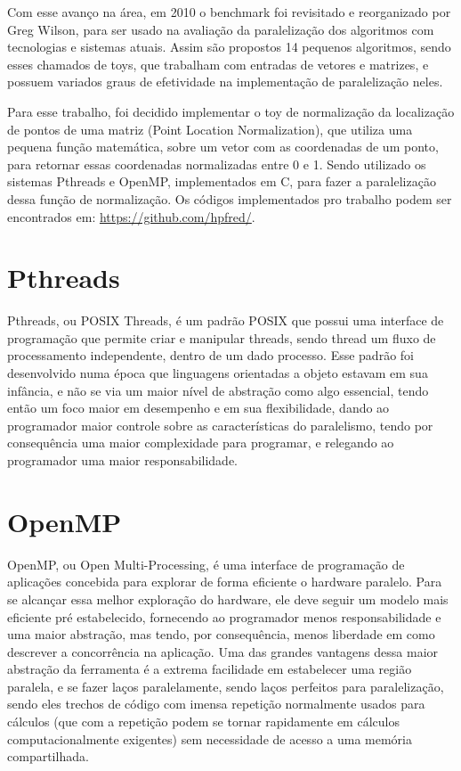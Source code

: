 \documentclass[12pt]{article}
\begin{document}
Com esse avanço na área, em 2010 o benchmark foi revisitado e reorganizado por Greg Wilson, para ser usado na avaliação da paralelização dos algoritmos com tecnologias e sistemas atuais. Assim são propostos 14 pequenos algoritmos, sendo esses chamados de toys, que trabalham com entradas de vetores e matrizes, e possuem variados graus de efetividade na implementação de paralelização neles.

Para esse trabalho, foi decidido implementar o toy de normalização da localização de pontos de uma matriz (Point Location Normalization), que utiliza uma pequena função matemática, sobre um vetor com as coordenadas de um ponto, para retornar essas coordenadas normalizadas entre 0 e 1. Sendo utilizado os sistemas Pthreads e OpenMP, implementados em C, para fazer a paralelização dessa função de normalização. Os códigos implementados pro trabalho podem ser encontrados em: \url{https://github.com/hpfred/}.

\section{Pthreads} \label{sec:firstpage}

Pthreads, ou POSIX Threads, é um padrão POSIX que possui uma interface de programação que permite criar e manipular threads, sendo thread um fluxo de processamento independente, dentro de um dado processo. Esse padrão foi desenvolvido numa época que linguagens orientadas a objeto estavam em sua infância, e não se via um maior nível de abstração como algo essencial, tendo então um foco maior em desempenho e em sua flexibilidade, dando ao programador maior controle sobre as características do paralelismo, tendo por consequência uma maior complexidade para programar, e relegando ao programador uma maior responsabilidade.

\section{OpenMP}

OpenMP, ou Open Multi-Processing, é uma interface de programação de aplicações concebida para explorar de forma eficiente o hardware paralelo. Para se alcançar essa melhor exploração do hardware, ele deve seguir um modelo mais eficiente pré estabelecido, fornecendo ao programador menos responsabilidade e uma maior abstração, mas tendo, por consequência, menos liberdade em como descrever a concorrência na aplicação. Uma das grandes vantagens dessa maior abstração da ferramenta é a extrema facilidade em estabelecer uma região paralela, e se fazer laços paralelamente, sendo laços perfeitos para paralelização, sendo eles trechos de código com imensa repetição normalmente usados para cálculos (que com a repetição podem se tornar rapidamente em cálculos computacionalmente exigentes) sem necessidade de acesso a uma memória compartilhada.
\end{document}
